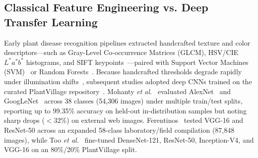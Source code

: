 \documentclass[journal]{IEEEtran}
\begin{document}
\subsection{Classical Feature Engineering vs. Deep Transfer Learning}
Early plant disease recognition pipelines extracted handcrafted texture and color descriptors---such as Gray-Level Co-occurrence Matrices (GLCM), HSV/CIE $L^*a^*b^*$ histograms, and SIFT keypoints~\cite{camargo2009, revathi2012}---paired with Support Vector Machines (SVM)~\cite{cortes1995} or Random Forests~\cite{breiman2001}. Because handcrafted thresholds degrade rapidly under illumination shifts~\cite{barbedo2013}, subsequent studies adopted deep CNNs trained on the curated PlantVillage repository~\cite{hughes2015}. Mohanty \textit{et al.}~\cite{mohanty2016} evaluated AlexNet~\cite{krizhevsky2012} and GoogLeNet~\cite{szegedy2015} across 38 classes (54,306 images) under multiple train/test splits, reporting up to 99.35\% accuracy on held-out in-distribution samples but noting sharp drops ($<32\%$) on external web images. Ferentinos~\cite{ferentinos2018} tested VGG-16 and ResNet-50 across an expanded 58-class laboratory/field compilation (87,848 images), while Too \textit{et al.}~\cite{too2019} fine-tuned DenseNet-121, ResNet-50, Inception-V4, and VGG-16 on an 80\%/20\% PlantVillage split.
\end{document}
